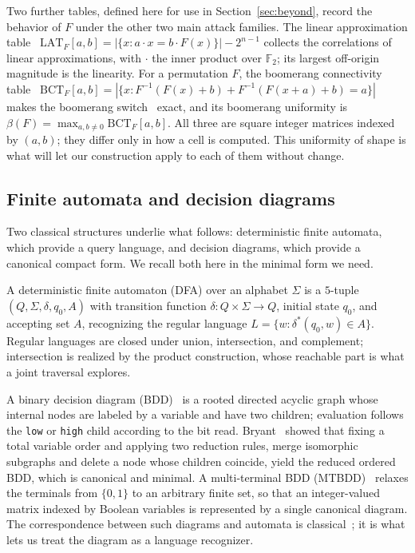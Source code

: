\documentclass[runningheads]{llncs}
\newcommand{\F}{\mathbb{F}}
\newcommand{\LAT}{\mathrm{LAT}}
\newcommand{\BCT}{\mathrm{BCT}}
\newcommand{\Sig}{\Sigma}
\begin{document}
Two further tables, defined here for use in Section~\ref{sec:beyond}, record the
behavior of $F$ under the other two main attack families. The linear
approximation table~\cite{Matsui1994} $\LAT_F[a,b]=|\{x:a\cdot x=b\cdot
F(x)\}|-2^{n-1}$ collects the correlations of linear approximations, with $\cdot$
the inner product over $\F_2$; its largest off-origin magnitude is the linearity.
For a permutation $F$, the boomerang connectivity table~\cite{CidEtAl2018}
$\BCT_F[a,b]=|\{x:F^{-1}(F(x)+b)+F^{-1}(F(x+a)+b)=a\}|$ makes the boomerang
switch~\cite{Wagner1999} exact, and its boomerang uniformity is
$\beta(F)=\max_{a,b\neq 0}\BCT_F[a,b]$. All three are square integer matrices
indexed by $(a,b)$; they differ only in how a cell is computed. This uniformity
of shape is what will let our construction apply to each of them without change.

\subsection{Finite automata and decision diagrams}

Two classical structures underlie what follows: deterministic finite automata,
which provide a query language, and decision diagrams, which provide a canonical
compact form. We recall both here in the minimal form we need.

A deterministic finite automaton (DFA) over an alphabet $\Sig$ is a $5$-tuple
$(Q,\Sig,\delta,q_0,A)$ with transition function $\delta:Q\times\Sig\to Q$,
initial state $q_0$, and accepting set $A$, recognizing the regular language
$L=\{w:\delta^{*}(q_0,w)\in A\}$. Regular languages are closed under union,
intersection, and complement; intersection is realized by the product
construction, whose reachable part is what a joint traversal explores.

A binary decision diagram (BDD)~\cite{Akers1978,Lee1959} is a rooted directed acyclic
graph whose internal nodes are labeled by a variable and have two children;
evaluation follows the \texttt{low} or \texttt{high} child according to the bit
read. Bryant~\cite{Bryant1986} showed that fixing a total variable order and applying
two reduction rules, merge isomorphic subgraphs and delete a node whose children
coincide, yield the reduced ordered BDD, which is canonical and minimal. A
multi-terminal BDD (MTBDD)~\cite{FujitaEtAl1997} relaxes the terminals from $\{0,1\}$ to an
arbitrary finite set, so that an integer-valued matrix indexed by Boolean
variables is represented by a single canonical diagram. The correspondence between
such diagrams and automata is classical~\cite{KimuraAndClarke1990}; it is what lets us treat
the diagram as a language recognizer.
\end{document}

